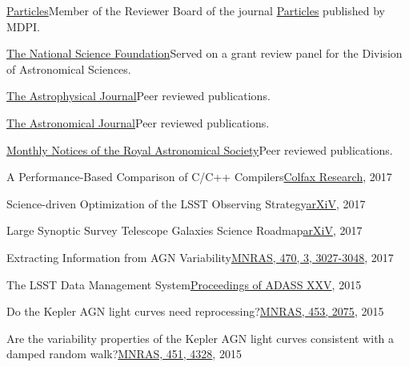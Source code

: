 \documentclass[10pt,a4paper]{article}
\begin{document}
\spacedhrule{2.0em}{0.2em}


\inlineheadsection
  {\href{https://www.mdpi.com/journal/particles/submission_reviewers}{Particles}}{Member of the Reviewer Board of the journal \href{https://www.mdpi.com/journal/particles}{Particles} published by MDPI.}

\inlineheadsection
  {\href{https://www.nsf.gov/}{The National Science Foundation}}{Served on a grant review panel for the Division of Astronomical Sciences.}

\inlineheadsection
  {\href{http://iopscience.iop.org/journal/0004-637X}{The Astrophysical Journal}}{Peer reviewed publications.}

\inlineheadsection
  {\href{https://iopscience.iop.org/journal/1538-3881}{The Astronomical Journal}}{Peer reviewed publications.}

\inlineheadsection
  {\href{https://academic.oup.com/mnras}{Monthly Notices of the Royal Astronomical Society}}{Peer reviewed publications.}

\spacedhrule{2.0em}{0.2em}

\pagebreak


\inlineheadsection
  {A Performance-Based Comparison of C/C++ Compilers}{\href{https://colfaxresearch.com/compiler-comparison/}{Colfax Research}, 2017}

\inlineheadsection
  {Science-driven Optimization of the LSST Observing Strategy}{\href{https://arxiv.org/abs/1708.04058}{arXiV}, 2017}

\inlineheadsection
  {Large Synoptic Survey Telescope Galaxies Science Roadmap}{\href{https://arxiv.org/abs/1708.01617}{arXiV}, 2017}

\inlineheadsection
  {Extracting Information from AGN Variability}{\href{https://doi.org/10.1093/mnras/stx1420}{MNRAS, 470, 3, 3027-3048}, 2017}

\inlineheadsection
  {The LSST Data Management System}{\href{http://adsabs.harvard.edu/cgi-bin/bib_query?arXiv:1512.07914}{Proceedings of ADASS XXV}, 2015}

\inlineheadsection
  {Do the Kepler AGN light curves need reprocessing?}{\href{http://dx.doi.org/10.1093/mnras/stv1797}{MNRAS, 453, 2075}, 2015}

\inlineheadsection
  {Are the variability properties of the Kepler AGN light curves consistent with a damped random walk?}{\href{http://dx.doi.org/ 10.1093/mnras/stv1230}{MNRAS, 451, 4328}, 2015}
\end{document}
